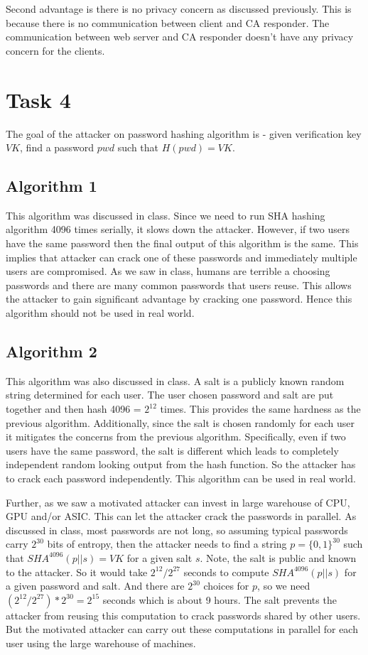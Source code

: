 \documentclass{article}
\begin{document}
    Second advantage is there is no privacy concern as discussed previously. This is because there is no communication between client and CA responder. The communication between web server and CA responder doesn't have any privacy concern for the clients.

    \section*{Task 4}
    The goal of the attacker on password hashing algorithm is - given verification key $VK$, find a password $pwd$ such that $H(pwd) = VK$.

    \subsection*{Algorithm 1}
    This algorithm was discussed in class. Since we need to run SHA hashing algorithm 4096 times serially, it slows down the attacker. However, if two users have the same password then the final output of this algorithm is the same. This implies that attacker can crack one of these passwords and immediately multiple users are compromised. As we saw in class, humans are terrible a choosing passwords and there are many common passwords that users reuse. This allows the attacker to gain significant advantage by cracking one password. Hence this algorithm should not be used in real world.

    \subsection*{Algorithm 2}
    This algorithm was also discussed in class. A salt is a publicly known random string determined for each user. The user chosen password and salt are put together and then hash 4096 = $2^{12}$ times. This provides the same hardness as the previous algorithm. Additionally, since the salt is chosen randomly for each user it mitigates the concerns from the previous algorithm. Specifically, even if two users have the same password, the salt is different which leads to completely independent random looking output from the hash function. So the attacker has to crack each password independently. This algorithm can be used in real world.

    Further, as we saw a motivated attacker can invest in large warehouse of CPU, GPU and/or ASIC. This can let the attacker crack the passwords in parallel. As discussed in class, most passwords are not long, so assuming typical passwords carry $2^{30}$ bits of entropy, then the attacker needs to find a string $p = \{0,1\}^{30}$ such that $SHA^{4096}(p || s) = VK$ for a given salt $s$. Note, the salt is public and known to the attacker. So it would take $2^{12} / 2^{27}$ seconds to compute $SHA^{4096}(p || s)$ for a given password and salt. And there are $2^{30}$ choices for $p$, so we need $(2^{12} / 2^{27}) * 2^{30} = 2^{15}$ seconds which is about 9 hours. The salt prevents the attacker from reusing this computation to crack passwords shared by other users. But the motivated attacker can carry out these computations in parallel for each user using the large warehouse of machines.
\end{document}
